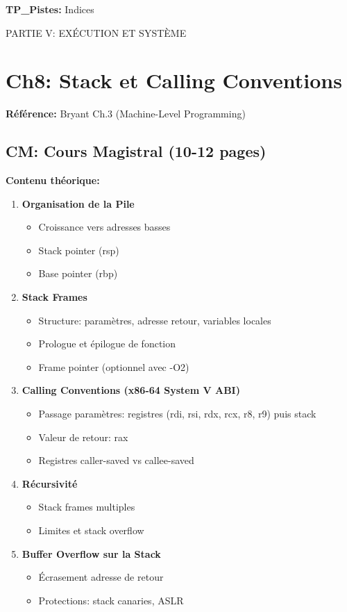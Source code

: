 \documentclass[10pt,a4paper]{article}
\begin{document}
\textbf{TP\_Pistes:} Indices

\newpage

\begin{partbox}
PARTIE V: EXÉCUTION ET SYSTÈME
\end{partbox}

\section{Ch8: Stack et Calling Conventions}

\textbf{Référence:} Bryant Ch.3 (Machine-Level Programming)

\subsection*{CM: Cours Magistral (10-12 pages)}

\textbf{Contenu théorique:}
\begin{enumerate}
\item \textbf{Organisation de la Pile}
   \begin{itemize}
   \item Croissance vers adresses basses
   \item Stack pointer (rsp)
   \item Base pointer (rbp)
   \end{itemize}

\item \textbf{Stack Frames}
   \begin{itemize}
   \item Structure: paramètres, adresse retour, variables locales
   \item Prologue et épilogue de fonction
   \item Frame pointer (optionnel avec -O2)
   \end{itemize}

\item \textbf{Calling Conventions (x86-64 System V ABI)}
   \begin{itemize}
   \item Passage paramètres: registres (rdi, rsi, rdx, rcx, r8, r9) puis stack
   \item Valeur de retour: rax
   \item Registres caller-saved vs callee-saved
   \end{itemize}

\item \textbf{Récursivité}
   \begin{itemize}
   \item Stack frames multiples
   \item Limites et stack overflow
   \end{itemize}

\item \textbf{Buffer Overflow sur la Stack}
   \begin{itemize}
   \item Écrasement adresse de retour
   \item Protections: stack canaries, ASLR
   \end{itemize}
\end{enumerate}
\end{document}
